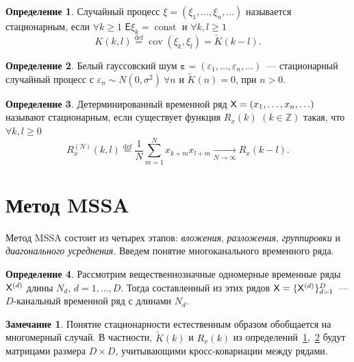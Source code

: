 \documentclass[specialist,
substylefile = spbu_report.rtx,
subf,href,colorlinks=true, 12pt]{disser}
\theoremstyle{definition}
\newtheorem{definition}{Определение}
\newtheorem{remark}{Замечание}
\begin{document}
\begin{definition}\label{def:stationaty_random}
	Случайный процесс $\xi=(\xi_1,\ldots, \xi_n,\ldots)$ называется стационарным, если $\forall k\geqslant1$ $\mathsf E\xi_k=\operatorname{const}$ и $\forall k,l\geqslant1$
	\[
	K(k, l)\overset{\text{def}}=\operatorname{cov}(\xi_k, \xi_l)= \widetilde{K}(k-l).
	\]
\end{definition}
\begin{definition}\label{def:stationaty_determ}
	Белый гауссовский шум $\boldsymbol{\varepsilon}=(\varepsilon_1,\ldots,\varepsilon_n,\ldots)$~--- стационарный случайный процесс с $\varepsilon_n\sim N(0, \sigma^2)~\forall n$ и $\widetilde K(n)=0$, при $n>0$.
\end{definition}
\begin{definition}
	Детерминированный временной ряд $\mathsf{X}=(x_1,\ldots,x_n,\ldots)$ называют стационарным, если существует функция $R_x(k)$ $(k\in\mathbb{Z})$ такая, что $\forall k,l\geqslant0$
	\begin{equation*}
		R_x^{(N)}(k,l)\overset{\text{def}}{=}\frac{1}{N}\sum_{m=1}^Nx_{k+m}x_{l+m}\underset{N\to\infty}\longrightarrow R_x(k - l).
	\end{equation*}
\end{definition}

\section{Метод MSSA}\label{sect:mssa}
Метод MSSA состоит из четырех этапов: \emph{вложения}, \emph{разложения}, \emph{группировки} и \emph{диагонального усреднения}. Введем понятие многоканального временного ряда.

\begin{definition}
	Рассмотрим вещественнозначные одномерные временные ряды $\mathsf{X}^{(d)}$ длины $N_d$, $d=1,\ldots,D$. Тогда составленный из этих рядов $\mathsf{X}=\{\mathsf{X}^{(d)}\}_{d=1}^D$~--- $D$-канальный временной ряд с длинами $N_d$.
\end{definition}
\begin{remark}
	Понятие стационарности естественным образом обобщается на многомерный случай. В частности, $\widetilde K(k)$ и $R_x(k)$ из определений~\ref{def:stationaty_random},~\ref{def:stationaty_determ} будут матрицами размера $D\times D$, учитывающими кросс-ковариации между рядами.
\end{remark}
\end{document}
